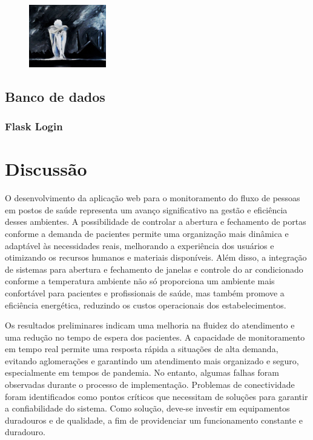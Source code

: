 \documentclass[conference, a4paper, 12pt]{IEEEtran}
\begin{document}
\begin{figure}[h]

  \begin{center}
    \includegraphics[width=0.30\textwidth]{help.jpeg}
  \end{center}
\end{figure}

\subsection{Banco de dados}
\subsubsection{Flask Login}

\section{Discussão}
\label{sec:discussion}
  O desenvolvimento da aplicação web para o monitoramento do fluxo de pessoas em postos de saúde representa um avanço significativo na gestão e eficiência desses ambientes. A possibilidade de controlar a abertura e fechamento de portas conforme a demanda de pacientes permite uma organização mais dinâmica e adaptável às necessidades reais, melhorando a experiência dos usuários e otimizando os recursos humanos e materiais disponíveis. Além disso, a integração de sistemas para abertura e fechamento de janelas e controle do ar condicionado conforme a temperatura ambiente não só proporciona um ambiente mais confortável para pacientes e profissionais de saúde, mas também promove a eficiência energética, reduzindo os custos operacionais dos estabelecimentos.

  Os resultados preliminares indicam uma melhoria na fluidez do atendimento e uma redução no tempo de espera dos pacientes. A capacidade de monitoramento em tempo real permite uma resposta rápida a situações de alta demanda, evitando aglomerações e garantindo um atendimento mais organizado e seguro, especialmente em tempos de pandemia. No entanto, algumas falhas foram observadas durante o processo de implementação. Problemas de conectividade foram identificados como pontos críticos que necessitam de soluções para garantir a confiabilidade do sistema. Como solução, deve-se investir em equipamentos duradouros e de qualidade, a fim de providenciar um funcionamento constante e duradouro.
\end{document}
